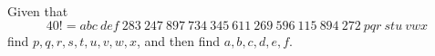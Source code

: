 Given that $$40! = abc\ def\ 283\ 247\ 897\ 734\ 345\ 611\ 269\ 596\ 115\ 894\ 272\ pqr\ stu\ vwx$$
find $p, q, r, s,t, u, v, w, x$, and then find $a, b, c, d, e, f$.
